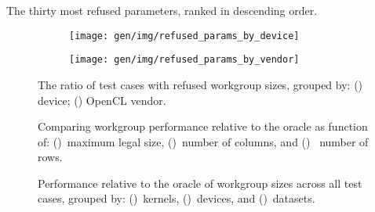 \begin{table}
\parbox{.32\linewidth}{
    \centering
    \scriptsize
    
  }
  \hfill
  \parbox{.32\linewidth}{
    \centering
    \scriptsize
    
  }
  \hfill
  \parbox{.32\linewidth}{
    \centering
    \scriptsize
    
  }
  \caption{The thirty most refused parameters, ranked in descending
    order.}
  \label{tab:top-refused-params}
\end{table}

\begin{figure}
\centering
\begin{subfigure}[h]{.45\textwidth}
  \centering
  \texttt{[image: gen/img/refused\_params\_by\_device]}
  \caption{}
  \label{fig:refused-params-by-device}
\end{subfigure}
\hfill
\begin{subfigure}[h]{.45\textwidth}
  \centering
  \texttt{[image: gen/img/refused\_params\_by\_vendor]}
  \caption{}
  \label{fig:refused-params-by-vendor}
\end{subfigure}
\caption{%
  The ratio of test cases with refused workgroup sizes, grouped by:
  () device;
  () OpenCL vendor.%
}
\label{fig:refused-params-by-dev-vendor}
\end{figure}



\cleardoublepage
\begin{figure}

\caption{%
  Comparing workgroup performance relative to the oracle as function
  of: ()~maximum legal size,
  ()~number of columns, and
  ()~ number of rows.%
}
\label{fig:performance-wgsizes}
\end{figure}

\begin{figure}

\caption{%
  Performance relative to the oracle of workgroup sizes across all
  test cases, grouped by: ()~kernels,
  ()~devices, and
  ()~datasets.%
}
\label{fig:performances}
\end{figure}


